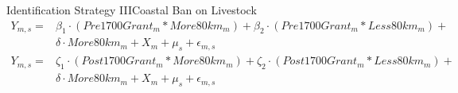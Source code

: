 \documentclass[aspectratio=1610]{beamer}
\begin{document}
\begin{frame}[t]{Identification Strategy III}{Coastal Ban on Livestock}
    \begin{equation*}
        \begin{split}
        Y_{m,s} = & \beta_1 \cdot (Pre1700Grant_m  * More80km_m) + \beta_2 \cdot (Pre1700Grant_m * Less80km_m) + \\  
        & \delta \cdot  More80km_m + X_{m} + \mu_s + \epsilon_{m,s}
        \end{split}	
      \end{equation*}
      \begin{equation*}
        \begin{split}
        Y_{m,s} = & \zeta_1 \cdot (Post1700Grant_m  * More80km_m) + \zeta_2 \cdot (Post1700Grant_m * Less80km_m) + \\ 
        & \delta \cdot  More80km_m + X_{m} + \mu_s + \epsilon_{m,s}
        \end{split}
      \end{equation*}

    

\end{frame}
\end{document}
